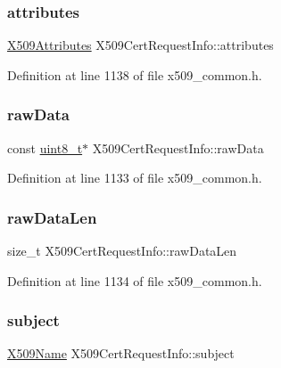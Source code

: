 \subsubsection{\texorpdfstring{attributes}{attributes}}
{\footnotesize\ttfamily \hyperlink{structX509Attributes}{X509\+Attributes} X509\+Cert\+Request\+Info\+::attributes}



Definition at line 1138 of file x509\+\_\+common.\+h.

\mbox{\label{structX509CertRequestInfo_ad9090d83592df4b2e2ffe1a670fb0a65}} 
\subsubsection{\texorpdfstring{raw\+Data}{rawData}}
{\footnotesize\ttfamily const \hyperlink{stdint_8h_aba7bc1797add20fe3efdf37ced1182c5}{uint8\+\_\+t}$\ast$ X509\+Cert\+Request\+Info\+::raw\+Data}



Definition at line 1133 of file x509\+\_\+common.\+h.

\mbox{\label{structX509CertRequestInfo_a74cd4d14596bbf4331b6e05f02ad8e53}} 
\subsubsection{\texorpdfstring{raw\+Data\+Len}{rawDataLen}}
{\footnotesize\ttfamily size\+\_\+t X509\+Cert\+Request\+Info\+::raw\+Data\+Len}



Definition at line 1134 of file x509\+\_\+common.\+h.

\mbox{\label{structX509CertRequestInfo_ab7cab6a9a43f28a64198f227f2abae3f}} 
\subsubsection{\texorpdfstring{subject}{subject}}
{\footnotesize\ttfamily \hyperlink{structX509Name}{X509\+Name} X509\+Cert\+Request\+Info\+::subject}



